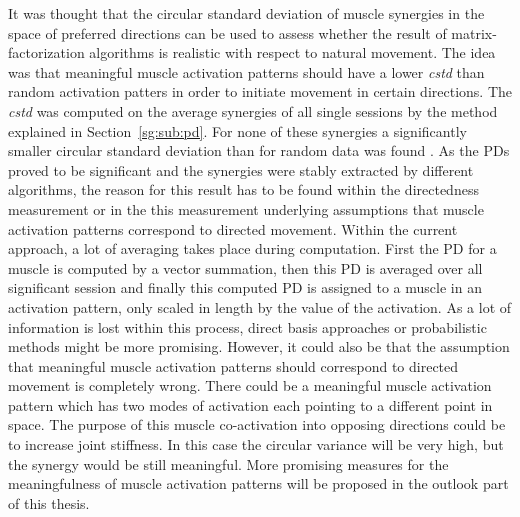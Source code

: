 It was thought that the circular standard deviation of muscle synergies in the space of preferred directions can be used to assess whether the result of matrix-factorization algorithms is realistic with respect to natural movement. The idea was that meaningful muscle activation patterns should have a lower \emph{cstd} than random activation patters in order to initiate movement in certain directions. The \emph{cstd} was computed on the average synergies of all single sessions by the method explained in Section~\ref{sg:sub:pd}. For none of these synergies a significantly smaller circular standard deviation than for random data was found .
As the PDs proved to be significant and the synergies were stably extracted by different algorithms, the reason for this result has to be found within the directedness measurement or in the this measurement underlying assumptions that muscle activation patterns correspond to directed movement. Within the current approach, a lot of averaging takes place during computation. First the PD for a muscle is computed by a vector summation, then this PD is averaged over all significant session
and finally this computed PD is assigned to a muscle in an activation pattern,
only scaled in length by the value of the activation. As a lot of information is lost within this process,
direct basis approaches or probabilistic methods might be more promising.
However, it could also be that the assumption that meaningful muscle activation patterns should correspond to
directed movement is completely wrong. There could be a meaningful muscle activation pattern
which has two modes of activation each pointing to a different point in space.
The purpose of this muscle co-activation into opposing directions could be to increase
joint stiffness. In this case the circular variance will be very high, but the synergy would be still meaningful. 
More promising measures for the meaningfulness of muscle activation patterns will be proposed in the outlook part
of this thesis.
